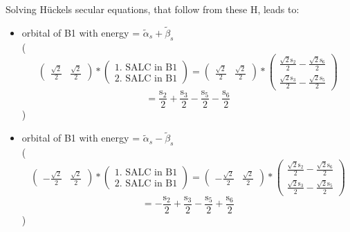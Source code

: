 \documentclass[12pt,a4paper]{article}
\begin{document}
Solving Hückels secular equations, that follow from these H, leads to:
\begin{itemize}
\item orbital of B1 with energy = 
                                $\tilde{\alpha}_{s} + \tilde{\beta}_{s}$ \\
( 
$$
\begin{pmatrix}\frac{\sqrt{2}}{2} & \frac{\sqrt{2}}{2}\end{pmatrix} * \left(\begin{array}{c}\text{1. SALC in B1} \\ \text{2. SALC in B1}\end{array}\right) = \begin{pmatrix}\frac{\sqrt{2}}{2} & \frac{\sqrt{2}}{2}\end{pmatrix} * \begin{pmatrix}\frac{\sqrt{2} \text{s}_{2}}{2} - \frac{\sqrt{2} \text{s}_{6}}{2}\\\frac{\sqrt{2} \text{s}_{3}}{2} - \frac{\sqrt{2} \text{s}_{5}}{2}\end{pmatrix} 
 $$ $$ = \frac{\text{s}_{2}}{2} + \frac{\text{s}_{3}}{2} - \frac{\text{s}_{5}}{2} - \frac{\text{s}_{6}}{2} 
 $$ 
 )

\item orbital of B1 with energy = 
                                $\tilde{\alpha}_{s} - \tilde{\beta}_{s}$ \\
( 
$$
\begin{pmatrix}- \frac{\sqrt{2}}{2} & \frac{\sqrt{2}}{2}\end{pmatrix} * \left(\begin{array}{c}\text{1. SALC in B1} \\ \text{2. SALC in B1}\end{array}\right) = \begin{pmatrix}- \frac{\sqrt{2}}{2} & \frac{\sqrt{2}}{2}\end{pmatrix} * \begin{pmatrix}\frac{\sqrt{2} \text{s}_{2}}{2} - \frac{\sqrt{2} \text{s}_{6}}{2}\\\frac{\sqrt{2} \text{s}_{3}}{2} - \frac{\sqrt{2} \text{s}_{5}}{2}\end{pmatrix} 
 $$ $$ = - \frac{\text{s}_{2}}{2} + \frac{\text{s}_{3}}{2} - \frac{\text{s}_{5}}{2} + \frac{\text{s}_{6}}{2} 
 $$ 
 )


\end{itemize}
\end{document}
